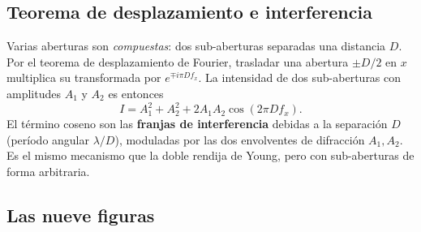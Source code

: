 \documentclass[11pt,a4paper]{article}
\begin{document}
\subsection{Teorema de desplazamiento e interferencia}
Varias aberturas son \emph{compuestas}: dos sub-aberturas separadas una distancia
$D$. Por el teorema de desplazamiento de Fourier, trasladar una abertura
$\pm D/2$ en $x$ multiplica su transformada por $e^{\mp i\pi D f_x}$. La intensidad
de dos sub-aberturas con amplitudes $A_1$ y $A_2$ es entonces
\begin{equation}
I = A_1^2 + A_2^2 + 2 A_1 A_2 \cos(2\pi D f_x).
\label{eq:interf}
\end{equation}
El término coseno son las \textbf{franjas de interferencia} debidas a la
separación $D$ (período angular $\lambda/D$), moduladas por las dos envolventes de
difracción $A_1,A_2$. Es el mismo mecanismo que la doble rendija de Young, pero
con sub-aberturas de forma arbitraria.

\subsection{Las nueve figuras}
\end{document}
